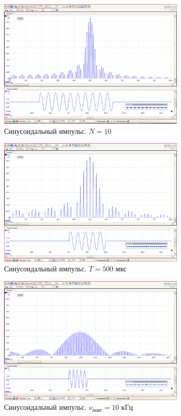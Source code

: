 \documentclass[a4paper]{article}
\begin{document}
\begin{figure}[h!]
\centering
\includegraphics[width=0.8\textwidth]{Цуг n=10.PNG}
\caption{Синусоидальный импульс. $N = 10$}
\end{figure}

\begin{figure}[h!]
\centering
\includegraphics[width=0.8\textwidth]{Цуг т=500.PNG}
\caption{Синусоидальный импульс. $T = 500$ мкс}
\end{figure}

\begin{figure}[h!]
\centering
\includegraphics[width=0.8\textwidth]{Цуг 100кГц.PNG}
\caption{Синусоидальный импульс. $\nu_\text{повт} = 10$ кГц}
\end{figure}
\end{document}
